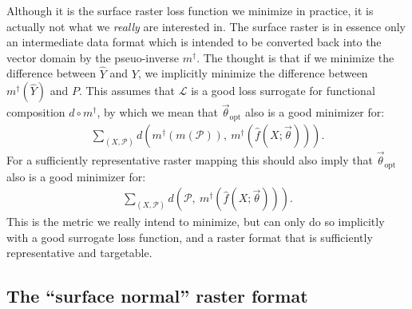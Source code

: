 Although it is the surface raster loss function we minimize in practice, it is actually not what we \emph{really} are interested in.
The surface raster is in essence only an intermediate data format which is intended to be converted back into the vector domain by the pseuo-inverse $m^{\dagger}$.
The thought is that if we minimize the difference between $\hat{Y}$ and $Y$, we implicitly minimize the difference between $m^{\dagger}(\hat{Y})$ and $P$.
This assumes that $\mathcal{L}$ is a good loss surrogate for functional composition $d \circ m^{\dagger}$, by which we mean that $\vec{\theta}_{\mathrm{opt}}$ also is a good minimizer for:
\begin{align*}
  \sum_{(X, \mathcal{P})}
  d\left(
    m^{\dagger}(m(\mathcal{P})),~
    m^{\dagger}(\hat{f}(X; \vec{\theta}))
  \right).
\end{align*}
For a sufficiently representative raster mapping this should also imply that $\vec{\theta}_{\mathrm{opt}}$ also is a good minimizer for:
\begin{align*}
  \sum_{(X, \mathcal{P})}
  d\left(
    \mathcal{P},~
    m^{\dagger}(\hat{f}(X; \vec{\theta}))
  \right).
\end{align*}
This is the metric we really intend to minimize, but can only do so implicitly with a good surrogate loss function, and a raster format that is sufficiently representative and targetable.

\subsection{The \enquote{surface normal} raster format}%
\label{sec:surface-normal-raster-format}

